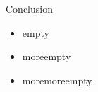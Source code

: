 \begin{frame}{Conclusion}

	\begin{minipage}[c][4cm]{\textwidth}
		\begin{itemize}
			\itemfill
			\item empty
			\item moreempty
			\item moremoreempty
		\end{itemize}
	\end{minipage}
	
\end{frame}
